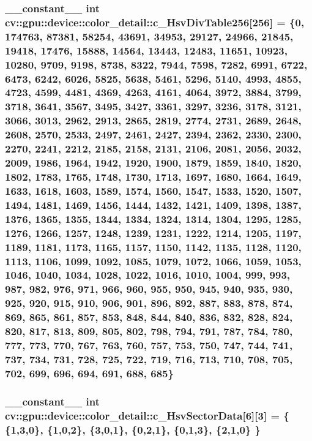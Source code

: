 \hypertarget{namespacecv_1_1gpu_1_1device_1_1color__detail_a06dee60b5257a350004f240de431795f}{
\subsubsection[{c\-\_\-\-Hsv\-Div\-Table256}]{\setlength{\rightskip}{0pt plus 5cm}\-\_\-\-\_\-constant\-\_\-\-\_\- int cv\-::gpu\-::device\-::color\-\_\-detail\-::c\-\_\-\-Hsv\-Div\-Table256\mbox{[}256\mbox{]} = \{0, 174763, 87381, 58254, 43691, 34953, 29127, 24966, 21845, 19418, 17476, 15888, 14564, 13443, 12483, 11651, 10923, 10280, 9709, 9198, 8738, 8322, 7944, 7598, 7282, 6991, 6722, 6473, 6242, 6026, 5825, 5638, 5461, 5296, 5140, 4993, 4855, 4723, 4599, 4481, 4369, 4263, 4161, 4064, 3972, 3884, 3799, 3718, 3641, 3567, 3495, 3427, 3361, 3297, 3236, 3178, 3121, 3066, 3013, 2962, 2913, 2865, 2819, 2774, 2731, 2689, 2648, 2608, 2570, 2533, 2497, 2461, 2427, 2394, 2362, 2330, 2300, 2270, 2241, 2212, 2185, 2158, 2131, 2106, 2081, 2056, 2032, 2009, 1986, 1964, 1942, 1920, 1900, 1879, 1859, 1840, 1820, 1802, 1783, 1765, 1748, 1730, 1713, 1697, 1680, 1664, 1649, 1633, 1618, 1603, 1589, 1574, 1560, 1547, 1533, 1520, 1507, 1494, 1481, 1469, 1456, 1444, 1432, 1421, 1409, 1398, 1387, 1376, 1365, 1355, 1344, 1334, 1324, 1314, 1304, 1295, 1285, 1276, 1266, 1257, 1248, 1239, 1231, 1222, 1214, 1205, 1197, 1189, 1181, 1173, 1165, 1157, 1150, 1142, 1135, 1128, 1120, 1113, 1106, 1099, 1092, 1085, 1079, 1072, 1066, 1059, 1053, 1046, 1040, 1034, 1028, 1022, 1016, 1010, 1004, 999, 993, 987, 982, 976, 971, 966, 960, 955, 950, 945, 940, 935, 930, 925, 920, 915, 910, 906, 901, 896, 892, 887, 883, 878, 874, 869, 865, 861, 857, 853, 848, 844, 840, 836, 832, 828, 824, 820, 817, 813, 809, 805, 802, 798, 794, 791, 787, 784, 780, 777, 773, 770, 767, 763, 760, 757, 753, 750, 747, 744, 741, 737, 734, 731, 728, 725, 722, 719, 716, 713, 710, 708, 705, 702, 699, 696, 694, 691, 688, 685\}}}\label{namespacecv_1_1gpu_1_1device_1_1color__detail_a06dee60b5257a350004f240de431795f}
\hypertarget{namespacecv_1_1gpu_1_1device_1_1color__detail_a861e8aa3b3c482b9a62dce1125486af7}{
\subsubsection[{c\-\_\-\-Hsv\-Sector\-Data}]{\setlength{\rightskip}{0pt plus 5cm}\-\_\-\-\_\-constant\-\_\-\-\_\- int cv\-::gpu\-::device\-::color\-\_\-detail\-::c\-\_\-\-Hsv\-Sector\-Data\mbox{[}6\mbox{]}\mbox{[}3\mbox{]} = \{ \{1,3,0\}, \{1,0,2\}, \{3,0,1\}, \{0,2,1\}, \{0,1,3\}, \{2,1,0\} \}}}\label{namespacecv_1_1gpu_1_1device_1_1color__detail_a861e8aa3b3c482b9a62dce1125486af7}
